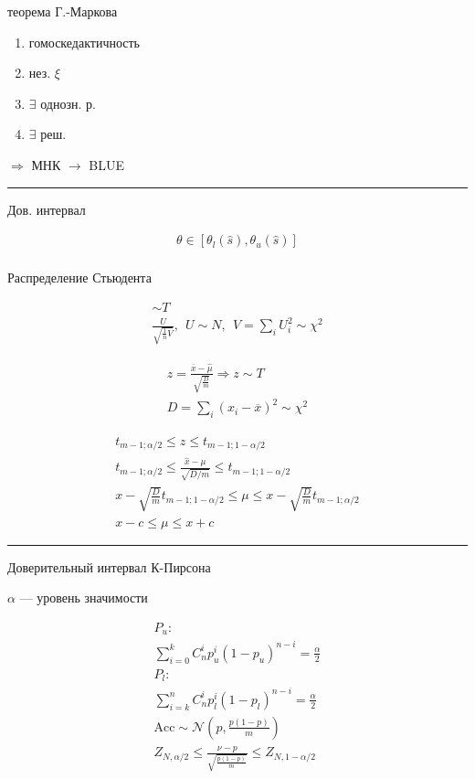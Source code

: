 \documentclass{book}
\begin{document}
теорема Г.-Маркова
\begin{enumerate}
    \item гомоскедактичность
    \item нез. $\xi$
    \item $\exists$ однозн. р.
    \item $\exists$ реш.
\end{enumerate}
$\Rightarrow$ МНК $\rightarrow$ BLUE

\hrule
Дов. интервал

\begin{gather*}
  \theta \in [\theta_l(\hat{s}), \theta_u(\hat{s})]\\
\end{gather*}

Распределение Стьюдента

\begin{gather*}
  \sim T\\
  \frac{U}{\sqrt{\frac{1}{n}V}},~~U\sim N,~~V=\sum_{i}^{} {U_i^2}\sim \chi^2
\end{gather*}

\begin{gather*}
  z=\frac{\overline{x}-\hat{\mu}}{\sqrt{\frac{D}{m}}} \Rightarrow
  z \sim T\\
  D = \sum_{i}^{} {(x_i-\overline{x})^2} \sim \chi^2
\end{gather*}

\begin{gather*}
  t_{m-1;\alpha/2}\leq z \leq t_{m-1;1-\alpha/2}\\
  t_{m-1;\alpha/2}\leq \frac{\hat{x}-\mu}{\sqrt{D/m}} \leq t_{m-1;1-\alpha/2}\\
  x-\sqrt{\frac{D}{m}}t_{m-1;1-\alpha/2} \leq \mu \leq x- \sqrt{\frac{D}{m}}t_{m-1;\alpha/2}\\
  x-c\leq \mu \leq x + c
\end{gather*}

\hrule
Доверительный интервал К-Пирсона

$\alpha$ --- уровень значимости

\begin{gather*}
    P_u:\\
    \sum_{i=0}^{k} {C^i_np^i_u(1-p_u)^{n-i}}=\frac{\alpha}{2}\\
    P_l:\\
    \sum_{i=k}^{n} {C^i_np^i_l(1-p_l)^{n-i}}=\frac{\alpha}{2}\\
    \mathrm{Acc} \sim \mathcal{N}\left(p, \frac{p(1-p)}{m}\right)\\
    Z_{N,\alpha/2} \leq \frac{\nu-p}{\sqrt{\frac{p(1-p)}{m}}}\leq Z_{N,1-\alpha/2}
\end{gather*}
\end{document}
